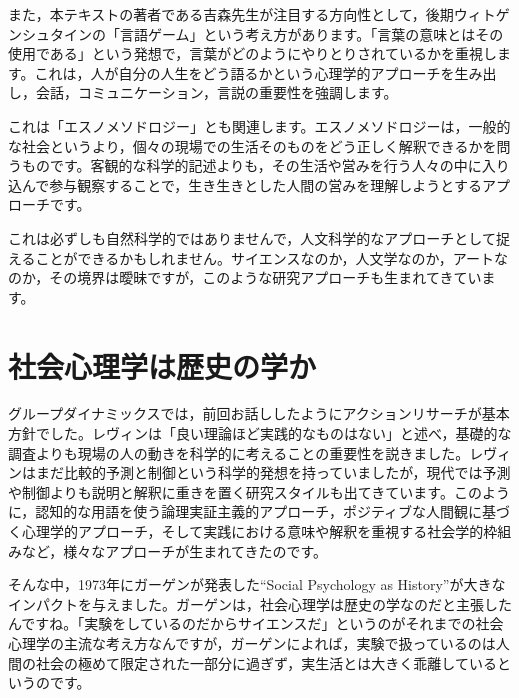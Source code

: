 \documentclass{ltjsbook}
\begin{document}
また，本テキストの著者である吉森先生が注目する方向性として，後期ウィトゲンシュタインの「言語ゲーム」という考え方があります。「言葉の意味とはその使用である」という発想で，言葉がどのようにやりとりされているかを重視します。これは，人が自分の人生をどう語るかという心理学的アプローチを生み出し，会話，コミュニケーション，言説の重要性を強調します。

これは「エスノメソドロジー」とも関連します。エスノメソドロジーは，一般的な社会というより，個々の現場での生活そのものをどう正しく解釈できるかを問うものです。客観的な科学的記述よりも，その生活や営みを行う人々の中に入り込んで参与観察することで，生き生きとした人間の営みを理解しようとするアプローチです。

これは必ずしも自然科学的ではありませんで，人文科学的なアプローチとして捉えることができるかもしれません。サイエンスなのか，人文学なのか，アートなのか，その境界は曖昧ですが，このような研究アプローチも生まれてきています。

\section{社会心理学は歴史の学か}

グループダイナミックスでは，前回お話ししたようにアクションリサーチが基本方針でした。レヴィンは「良い理論ほど実践的なものはない」と述べ，基礎的な調査よりも現場の人の動きを科学的に考えることの重要性を説きました。レヴィンはまだ比較的予測と制御という科学的発想を持っていましたが，現代では予測や制御よりも説明と解釈に重きを置く研究スタイルも出てきています。このように，認知的な用語を使う論理実証主義的アプローチ，ポジティブな人間観に基づく心理学的アプローチ，そして実践における意味や解釈を重視する社会学的枠組みなど，様々なアプローチが生まれてきたのです。

そんな中，1973年にガーゲンが発表した``Social Psychology as History''が大きなインパクトを与えました。ガーゲンは，社会心理学は歴史の学なのだと主張したんですね。「実験をしているのだからサイエンスだ」というのがそれまでの社会心理学の主流な考え方なんですが，ガーゲンによれば，実験で扱っているのは人間の社会の極めて限定された一部分に過ぎず，実生活とは大きく乖離しているというのです。
\end{document}
